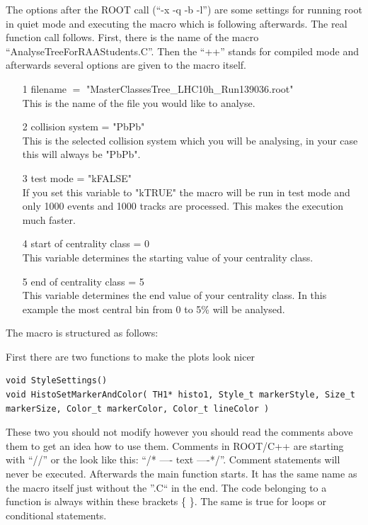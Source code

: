 \documentclass{article}
\begin{document}
The options after the ROOT call (``-x -q -b -l'') are some settings for 
running root in quiet mode and executing the macro which is following 
afterwards. The real function call follows. First, there is the name of the 
macro ``AnalyseTreeForRAAStudents.C''. Then the ``++'' stands for compiled 
mode and afterwards several options are given to the macro itself. 

\begin{itemize}
\item[1] filename $=$ "MasterClassesTree\_LHC10h\_Run139036.root"\\
  This is the name of the file you would like to analyse.
\item[2] collision system =  "PbPb" \\
  This is the selected collision system which you will be analysing, in your 
  case this will always be "PbPb".
\item[3] test mode = "kFALSE"\\
  If you set this variable to "kTRUE" the macro will be run in test mode and 
  only 1000 events and 1000 tracks are processed. This makes the execution
  much faster.
\item[4] start of centrality class = 0\\
  This variable determines the starting value of your centrality class.
\item[5] end of centrality class = 5\\
  This variable determines the end value of your centrality class. 
  In this example the most central bin from 0 to 5\% will be analysed.
 \end{itemize}

The macro is structured as follows:

First there are two functions to make the plots look nicer 

\begin{lstlisting}[]
void StyleSettings() 
void HistoSetMarkerAndColor( TH1* histo1, Style_t markerStyle, Size_t markerSize, Color_t markerColor, Color_t lineColor )
\end{lstlisting}

These two you should not modify however you should read the comments above 
them to get an idea how to use them. Comments in ROOT/C++ are starting with 
``//'' or the look like this: ``/* ---- text ----*/''. Comment statements will 
never be executed. Afterwards the main function starts. It has the same name 
as the macro itself just without the ''.C`` in the end. The code belonging to 
a function is always within these brackets \{ \}. The same is true for loops 
or conditional statements. 
\end{document}
